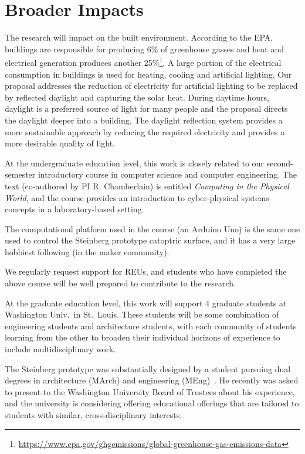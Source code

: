 \section{Broader Impacts}
\label{sec:broader}

The research will impact on the built environment.
According to the EPA, buildings are responsible for producing 6\% of
greenhouse gasses and heat and electrical generation produces another
25\%\footnote{\url{https://www.epa.gov/ghgemissions/global-greenhouse-gas-emissions-data}}.
A large portion of the electrical consumption in buildings is used for
heating, cooling and artificial lighting. Our proposal addresses the
reduction of electricity for artificial lighting to be replaced by
reflected daylight and capturing the solar heat. During daytime hours,
daylight is a preferred source of light for many people and the proposal
directs the daylight deeper into a building. The daylight reflection system
provides a more sustainable approach by reducing the required electricity
and provides a more desirable quality of light.

At the undergraduate education level, this work is closely related to
our second-semester introductory course in computer science and
computer engineering.  The
text (co-authored by PI R. Chamberlain) is entitled {\it Computing
in the Physical World}, and the course provides an introduction to
cyber-physical systems concepts in a laboratory-based setting.

The computational platform used in the course (an Arduino Uno) is the
same one used to control the Steinberg prototype catoptric surface,
and it has a very large hobbiest following (in the maker community).

We regularly request support for REUs, and students who have completed
the above course will be well prepared to contribute to the research.

At the graduate education level, this work will support 4 graduate
students at Washington Univ.~in St.~Louis.
These students will be some combination of engineering students and
architecture students, with each community of students learning from
the other to broaden their individual horizons of experience to
include multidisciplinary work.

The Steinberg prototype was substantially designed by a student pursuing
dual degrees in architecture (MArch) and engineering (MEng)~\cite{Mitchell18}.
He recently was asked to present to the Washington University Board
of Trustees about his experience, and the university is considering
offering educational offerings that are tailored to students with
similar, cross-disciplinary interests.

